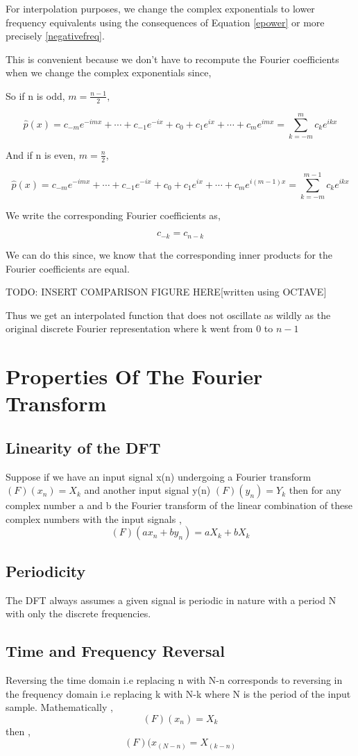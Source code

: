 \documentclass[11pt]{amsart}
\theoremstyle{definition}
\theoremstyle{remark}
\numberwithin{equation}{section}
\begin{document}
For interpolation purposes, we change the complex exponentials to lower frequency equivalents using the consequences of Equation \ref{epower} or more precisely \ref{negativefreq}.

This is convenient because we don't have to recompute the Fourier coefficients when we change the complex exponentials since,

So if n is odd, $m = \frac{n-1}{2},$

\[
	\hat{p}(x) = c_{-m} e^{-imx} + \cdots + c_{-1} e^{-ix} + c_0 + c_1e^{ix} + \cdots + c_me^{imx} = \sum_{k = -m}^{m} c_k e^{ikx}
\]

And if n is even, $m = \frac{n}{2},$

\[
	\hat{p}(x) = c_{-m} e^{-imx} + \cdots + c_{-1} e^{-ix} + c_0 + c_1e^{ix} + \cdots + c_me^{i(m-1)x} = \sum_{k = -m}^{m-1} c_k e^{ikx}
\]

We write the corresponding Fourier coefficients as,

\[
	c_{-k} = c_{n-k}
\]

We can do this since, we know that the corresponding inner products for the Fourier coefficients are equal.

TODO: INSERT COMPARISON FIGURE HERE[written using OCTAVE]

Thus we get an interpolated function that does not oscillate as wildly as the original discrete Fourier representation where k went from $0$ to $n-1$


\section{Properties Of The Fourier Transform}
\subsection{Linearity of the DFT}
Suppose if we have an input signal x(n) undergoing a Fourier transform $(F)(x_n) = X_k$ and another input  signal y(n) $(F)(y_n) = Y_k$ then for any complex number a and b the  Fourier transform of the linear combination of these complex numbers with the input signals , 
\[(F)(ax_n + by_n) = aX_k + bX_k\]

\subsection{Periodicity}
The DFT always assumes a given signal is periodic in nature with a period N with only the discrete frequencies. 

\subsection{Time and Frequency Reversal}
Reversing the time domain i.e replacing n with N-n corresponds to reversing in the frequency domain i.e replacing k with N-k where N is the period of the input sample.
Mathematically ,
\[(F)(x_n) = X_k \] then , 
\[(F)(x_(N-n) = X_(k-n)\]
\end{document}
